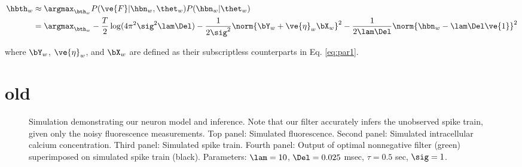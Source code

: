 \begin{subequations}
\begin{align} \label{eq:w_par}
\hbth_w &\approx \argmax_{\bth_w}P(\ve{F}| \hbn_w, \thet_w) P(\hbn_w | \thet_w) \\
&= \argmax_{\bth_w} -\frac{T}{2} \log (4\pi^2\sig^2\lam\Del) - \frac{1}{2\sig^2} \norm{\bY_w + \ve{\eta}_w \bX_w}^2 - \frac{1}{2\lam\Del} \norm{\hbn_w - \lam\Del\ve{1}}^2
\end{align}
\end{subequations}

\noindent where $\bY_w$, $\ve{\eta}_w$, and $\bX_w$ are defined as their subscriptless counterparts in Eq. \eqref{eq:par1}.



\section{old}


\begin{figure}
\caption{Simulation demonstrating our neuron model and inference. Note that our filter accurately infers the unobserved spike train, given only the noisy fluorescence measurements.  Top panel: Simulated fluorescence. Second panel: Simulated intracellular calcium concentration. Third panel: Simulated spike train.  Fourth panel: Output of optimal nonnegative filter (green) superimposed on simulated spike train (black).  Parameters: $\lam=10$, $\Del=0.025$ msec, $\tau=0.5$ sec, $\sig=1$.} \label{fig:demo}
\end{figure}

